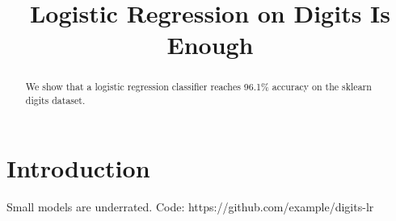 \documentclass{article}
\title{Logistic Regression on Digits Is Enough}
\begin{document}
\maketitle
\begin{abstract}
We show that a logistic regression classifier reaches 96.1\% accuracy on the sklearn digits dataset.
\end{abstract}
\section{Introduction}
Small models are underrated. Code: https://github.com/example/digits-lr


\end{document}
